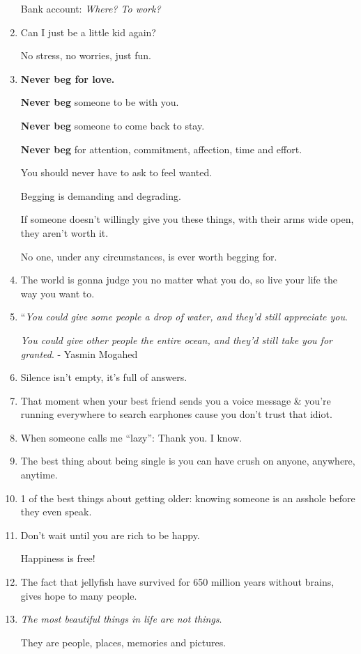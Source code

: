 \documentclass{article}
\begin{document}
\begin{enumerate}
	Bank account: \textit{Where? To work?}
	\item Can I just be a little kid again?
	
	No stress, no worries, just fun.
	\item \textbf{Never beg for love.}
	
	\textbf{Never beg} someone to be with you.
	
	\textbf{Never beg} someone to come back to stay.
	
	\textbf{Never beg} for attention, commitment, affection, time and effort.
	
	You should never have to ask to feel wanted.
	
	Begging is demanding and degrading.
	
	If someone doesn't willingly give you these things, with their arms wide open, they aren't worth it.
	
	No one, under any circumstances, is ever worth begging for.
	\item The world is gonna judge you no matter what you do, so live your life the way you want to.
	\item ``\textit{You could give some people a drop of water, and they'd still appreciate you}.
	
	\textit{You could give other people the entire ocean, and they'd still take you for granted}. - Yasmin Mogahed
	\item Silence isn't empty, it's full of answers.
	\item That moment when your best friend sends you a voice message \& you're running everywhere to search earphones cause you don't trust that idiot.
	\item When someone calls me ``lazy'': Thank you. I know.
	\item The best thing about being single is you can have crush on anyone, anywhere, anytime.
	\item 1 of the best things about getting older: knowing someone is an asshole before they even speak.
	\item Don't wait until you are rich to be happy.
	
	Happiness is free!
	\item The fact that jellyfish have survived for 650 million years without brains, gives hope to many people.
	\item \textit{The most beautiful things in life are not things}.
	
	They are people, places, memories and pictures.
	

\end{enumerate}
\end{document}
